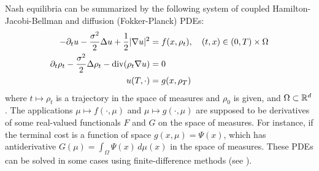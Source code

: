 \documentclass[../report.tex]{subfiles}
\begin{document}
Nash equilibria can be summarized by the following system of coupled Hamilton-Jacobi-Bellman and diffusion (Fokker-Planck) PDEs:
\begin{subequations}\label{eq:QuadraticMFG}
	\begin{align}\label{eq:MFGHJB}
	-\partial_t u - \frac{\sigma^2}{2}\Delta u + \frac12|\nabla u|^2 &= f(x, \rho_t), \quad (t,x) \in  (0, T) \times \Omega \\\label{eq:MFGKolmo}
	\partial_t \rho_t - \frac{\sigma^2}{2}\Delta\rho_t - \operatorname{div}(\rho_t \nabla u) &= 0 \\
	u(T, \cdot) &= g(x, \rho_T)
	\end{align}
\end{subequations}
where $t\mapsto \rho_t$ is a trajectory in the space of measures and $\rho_0$ is given, and $\Omega\subset\mathbb{R}^d$. The applications $\mu\mapsto f(\cdot, \mu)$ and $\mu\mapsto g(\cdot, \mu)$ are supposed to be derivatives of some real-valued functionals $F$ and $G$ on the space of measures. For instance, if the terminal cost is a function of space $g(x, \mu) = \Psi(x)$, which has antiderivative $G(\mu) = \int_\Omega \Psi(x) \,d\mu(x)$ in the space of measures.
These PDEs can be solved in some cases using finite-difference methods (see \textcite{achdou:hal-01456506}).
\end{document}
